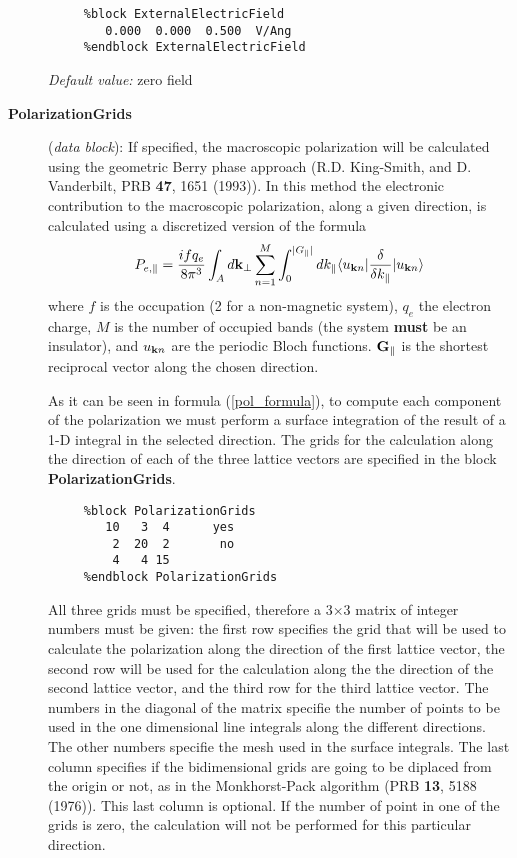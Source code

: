 \begin{description}
\begin{verbatim}
     %block ExternalElectricField
        0.000  0.000  0.500  V/Ang
     %endblock ExternalElectricField
\end{verbatim}

{\it Default value:} zero field

\item[{\bf PolarizationGrids}] ({\it data block}):
If specified, the macroscopic polarization will be calculated using the
geometric Berry phase approach (R.D. King-Smith, and D. Vanderbilt,
PRB {\bf 47}, 1651 (1993)). In this method the electronic 
contribution to the macroscopic polarization, along a given direction, 
is calculated using
a discretized version of the formula
\begin{equation}
\label{pol_formula}
    P_{e,\parallel}={ifq_e \over 8\pi^3} \int_A d{\bf k}_\perp
    \sum_{n=1}^M \int_0^{|G_\parallel|} dk_{\parallel}
     \langle u_{{\bf k} n} |{\delta \over \delta k_{\parallel}} |
      u_{{\bf k} n} \rangle
\end{equation}
where $f$ is the occupation (2 for a non-magnetic system), 
$q_e$ the electron charge, $M$ is the number of occupied bands (the
system {\bf must} be an insulator), and $u_{{\bf k} n}$ are
the periodic Bloch functions. ${\bf G}_\parallel$ is the shortest
reciprocal vector along the chosen direction. 

As it can be seen in formula (\ref{pol_formula}), to compute each 
component of the polarization we must perform a surface integration
of the result of a 1-D integral in the selected direction. 
The grids for the calculation along the direction of each of the
three lattice vectors are specified in the block
{\bf PolarizationGrids}. 
\begin{verbatim}
     %block PolarizationGrids
        10   3  4      yes
         2  20  2       no
         4   4 15
     %endblock PolarizationGrids
\end{verbatim}      

All three grids must be specified, therefore
a 3$\times$3 matrix of integer numbers must be given:
the first row specifies the grid that 
will be used to calculate the polarization
along the direction of the first lattice vector,
the second row will be used for the calculation along the
the direction of the second lattice vector, and the
third row for the third lattice vector.
The numbers in the diagonal of the matrix specifie the number
of points to be used in the one dimensional line integrals along
the different directions. The other numbers specifie the mesh
used in the surface integrals.
The last column specifies if the bidimensional grids
are going to be diplaced from the origin or not, as in the
Monkhorst-Pack algorithm (PRB {\bf 13}, 5188 (1976)).
This last column is optional.
If the number of point in one of the grids is zero, the calculation
will not be performed for this particular direction.


\end{description}
